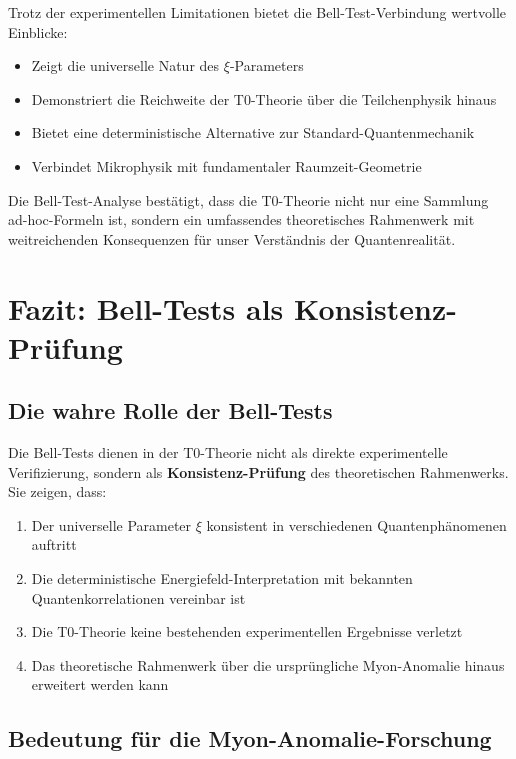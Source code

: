 \documentclass[12pt,a4paper]{article}
\begin{document}
\begin{critical}
		Trotz der experimentellen Limitationen bietet die Bell-Test-Verbindung wertvolle Einblicke:
		\begin{itemize}
			\item Zeigt die universelle Natur des $\xi$-Parameters
			\item Demonstriert die Reichweite der T0-Theorie \"uber die Teilchenphysik hinaus
			\item Bietet eine deterministische Alternative zur Standard-Quantenmechanik
			\item Verbindet Mikrophysik mit fundamentaler Raumzeit-Geometrie
		\end{itemize}
		
		Die Bell-Test-Analyse best\"atigt, dass die T0-Theorie nicht nur eine Sammlung ad-hoc-Formeln ist, sondern ein umfassendes theoretisches Rahmenwerk mit weitreichenden Konsequenzen f\"ur unser Verst\"andnis der Quantenrealit\"at.
	\end{critical}
	
	\section{Fazit: Bell-Tests als Konsistenz-Pr\"ufung}
	
	
		\subsection{Die wahre Rolle der Bell-Tests}
		
		Die Bell-Tests dienen in der T0-Theorie nicht als direkte experimentelle Verifizierung, sondern als \textbf{Konsistenz-Pr\"ufung} des theoretischen Rahmenwerks. Sie zeigen, dass:
		
		\begin{enumerate}
			\item Der universelle Parameter $\xi$ konsistent in verschiedenen Quantenph\"anomenen auftritt
			\item Die deterministische Energiefeld-Interpretation mit bekannten Quantenkorrelationen vereinbar ist
			\item Die T0-Theorie keine bestehenden experimentellen Ergebnisse verletzt
			\item Das theoretische Rahmenwerk \"uber die urspr\"ungliche Myon-Anomalie hinaus erweitert werden kann
		\end{enumerate}
		
		\subsection{Bedeutung f\"ur die Myon-Anomalie-Forschung}
		
\end{document}
